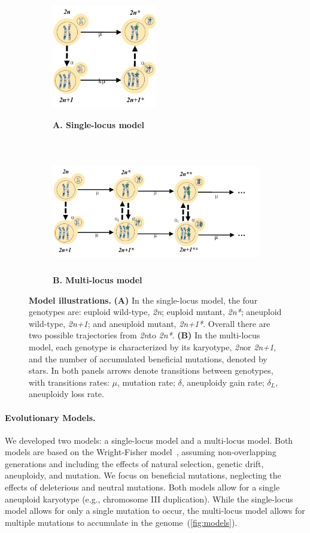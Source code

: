 \documentclass[12pt]{extarticle}
\newcommand{\euwt}{\emph{2n}}
\newcommand{\anwt}{\emph{2n+1}}
\newcommand{\eumt}{\emph{2n*}}
\newcommand{\anmt}{\emph{2n+1*}}
\begin{document}
\begin{figure}[b!]
  \centering
  \begin{subfigure}[t]{0.5\textwidth}
      \caption{
        \textbf{A. Single-locus model}
      }
      \centering
      \includegraphics[height=1.8in]{../figures/Fig1-A.pdf}      
      \label{fig:model1}
  \end{subfigure}%
  \\
  \begin{subfigure}[t]{0.5\textwidth}
  	  \caption{
        \textbf{B. Multi-locus model}
      }
      \centering
      \includegraphics[height=1.8in]{../figures/Fig1-B.pdf}      
      \label{fig:model2}
  \end{subfigure}
  \caption{
    \textbf{Model illustrations.}
    \textbf{(A)} In the single-locus model, the four genotypes are: euploid wild-type, \euwt; euploid mutant, \eumt; aneuploid wild-type, \anwt; and aneuploid mutant, \anmt.
    Overall there are two possible trajectories from \euwt to \eumt.
    \textbf{(B)} In the multi-locus model, each genotype is characterized by its karyotype, \euwt or \anwt, and the number of accumulated beneficial mutations, denoted by stars. 
    In both panels arrows denote transitions between genotypes, with transitions rates: $\mu$, mutation rate; $\delta$, aneuploidy gain rate; $\delta_L$, aneuploidy loss rate.
  }
  \label{fig:models}
\end{figure}

\paragraph*{Evolutionary Models.}
We developed two models: a single-locus model and a multi-locus model. 
Both models are based on the Wright-Fisher model~\citep{Otto2007}, assuming non-overlapping generations and including the effects of natural selection, genetic drift, aneuploidy, and mutation. 
We focus on beneficial mutations, neglecting the effects of deleterious and neutral mutations. Both models allow for a single aneuploid karyotype (e.g., chromosome III duplication).
While the single-locus model allows for only a single mutation to occur, the
multi-locus model allows for multiple mutations to accumulate in the genome~(\autoref{fig:models}).
\end{document}

